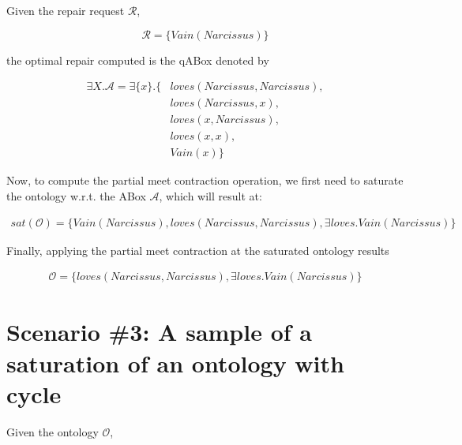 Given the repair request $\mathcal{R}$,

$$\mathcal{R} = \{ Vain(Narcissus) \}$$

the optimal repair computed is the qABox denoted by

\begin{equation*}
    \begin{aligned}
        \exists X.\mathcal{A} = \exists \{ x \}.\{ & loves(Narcissus, Narcissus),  \\
                                                   & loves(Narcissus, x),          \\
                                                   & loves(x, Narcissus),          \\
                                                   & loves(x, x),                  \\ 
                                                   & Vain(x) \}
    \end{aligned}
\end{equation*}

Now, to compute the partial meet contraction operation, we first need to saturate the ontology w.r.t. the ABox $\mathcal{A}$, which will result at:

\begin{equation*}
    \begin{aligned}
        sat(\mathcal{O}) = \{ Vain(Narcissus), loves(Narcissus, Narcissus), \exists loves.Vain(Narcissus) \}
    \end{aligned}
\end{equation*}

Finally, applying the partial meet contraction at the saturated ontology results

\begin{equation*}
    \begin{aligned}
        \mathcal{O} = \{ loves(Narcissus, Narcissus), \exists loves.Vain(Narcissus) \}
    \end{aligned}
\end{equation*}

\section{Scenario \#3: A sample of a saturation of an ontology with cycle}
\label{sec:scenario-3}

Given the ontology $\mathcal{O}$,

